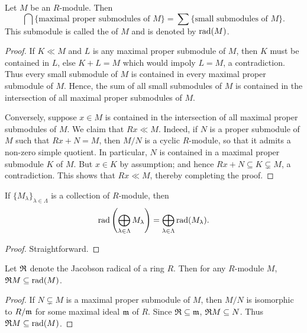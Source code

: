 \begin{proposition}
    Let $M$ be an $R$-module. Then 
    \begin{equation*}
        \bigcap\bigg\{\text{maximal proper submodules of }M\bigg\} = \sum\bigg\{\text{small submodules of }M\bigg\}.
    \end{equation*}
    This submodule is called the  of $M$ and is denoted by $\operatorname{rad}(M)$.
\end{proposition}
\begin{proof}
    If $K\ll M$ and $L$ is any maximal proper submodule of $M$, then $K$ must be contained in $L$, else $K + L = M$ which would impoly $L = M$, a contradiction. Thus every small submodule of $M$ is contained in every maximal proper submodule of $M$. Hence, the sum of all small submodules of $M$ is contained in the intersection of all maximal proper submodules of $M$.

    Conversely, suppose $x\in M$ is contained in the intersection of all maximal proper submodules of $M$. We claim that $Rx\ll M$. Indeed, if $N$ is a proper submodule of $M$ such that $Rx + N = M$, then $M/N$ is a cyclic $R$-module, so that it admits a non-zero simple quotient. In particular, $N$ is contained in a maximal proper submodule $K$ of $M$. But $x\in K$ by assumption; and hence $Rx + N\subseteq K\subsetneq M$, a contradiction. This shows that $Rx\ll M$, thereby completing the proof.
\end{proof}

\begin{proposition}
    If $\{M_\lambda\}_{\lambda\in\Lambda}$ is a collection of $R$-module, then 
    \begin{equation*}
        \operatorname{rad}\left(\bigoplus_{\lambda\in\Lambda} M_\lambda\right) = \bigoplus_{\lambda\in\Lambda} \operatorname{rad}(M_\lambda).
    \end{equation*}
\end{proposition}
\begin{proof}
    Straightforward.
\end{proof}

\begin{proposition}
    Let $\mathfrak{R}$ denote the Jacobson radical of a ring $R$. Then for any $R$-module $M$, $\mathfrak{R} M\subseteq\operatorname{rad}(M)$.
\end{proposition}
\begin{proof}
    If $N\subsetneq M$ is a maximal proper submodule of $M$, then $M/N$ is isomorphic to $R/\mathfrak{m}$ for some maximal ideal $\mathfrak{m}$ of $R$. Since $\mathfrak{R}\subseteq\mathfrak{m}$, $\mathfrak{R} M\subseteq N$. Thus $\mathfrak{R} M\subseteq\operatorname{rad} (M)$.
\end{proof}

